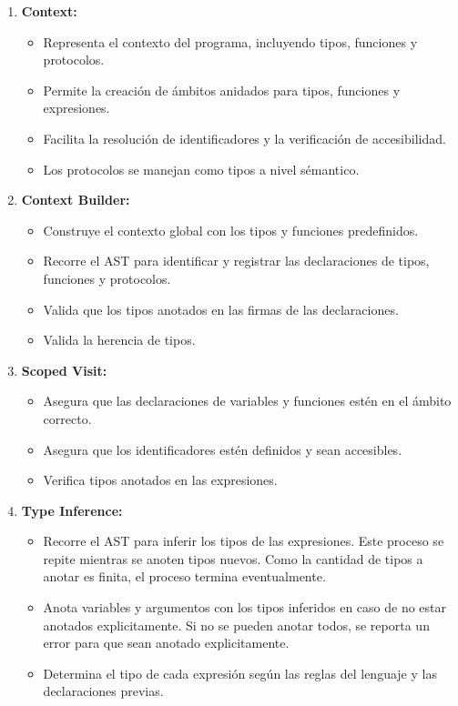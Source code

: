 \documentclass{article}
\begin{document}
\begin{enumerate}
  
  \item \textbf{Context:}
  \begin{itemize}
    \item Representa el contexto del programa, incluyendo tipos, funciones y protocolos.
    \item Permite la creación de ámbitos anidados para tipos, funciones y expresiones.
    \item Facilita la resolución de identificadores y la verificación de accesibilidad.
    \item Los protocolos se manejan como tipos a nivel sémantico.
  \end{itemize}

  \item \textbf{Context Builder:} 
  \begin{itemize}
    \item Construye el contexto global con los tipos y funciones predefinidos.
    \item Recorre el AST para identificar y registrar las declaraciones de tipos, funciones y protocolos.
    \item Valida que los tipos anotados en las firmas de las declaraciones.
    \item Valida la herencia de tipos.
  \end{itemize}
  
  \item \textbf{Scoped Visit:} 
  \begin{itemize}
    \item Asegura que las declaraciones de variables y funciones estén en el ámbito correcto.
    \item Asegura que los identificadores estén definidos y sean accesibles.
    \item Verifica tipos anotados en las expresiones.
  \end{itemize}
  
  \item \textbf{Type Inference:} 
  \begin{itemize}
    \item Recorre el AST para inferir los tipos de las expresiones. Este proceso se repite mientras se anoten tipos nuevos. Como la cantidad de tipos a anotar es finita, el proceso termina eventualmente.
    \item Anota variables y argumentos con los tipos inferidos en caso de no estar anotados explicitamente. Si no se pueden anotar todos, se reporta un error para que sean anotado explicitamente.
    \item Determina el tipo de cada expresión según las reglas del lenguaje y las declaraciones previas.
  \end{itemize}
  

\end{enumerate}
\end{document}
